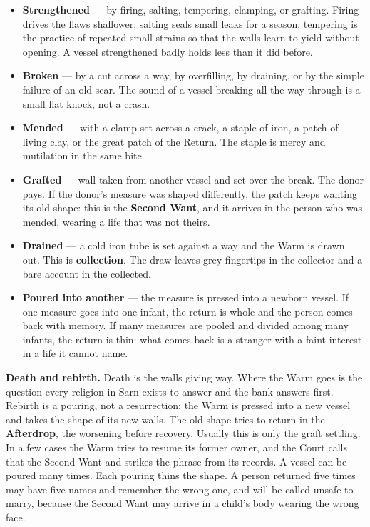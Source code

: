 \documentclass{design/chronicle}
\begin{document}
\begin{itemize}[leftmargin=1.4em,itemsep=1pt,topsep=3pt,parsep=0pt]

\item \textbf{Strengthened} — by firing, salting, tempering, clamping, or grafting. Firing drives the flaws shallower; salting seals small leaks for a season; tempering is the practice of repeated small strains so that the walls learn to yield without opening. A vessel strengthened badly holds less than it did before.

\item \textbf{Broken} — by a cut across a way, by overfilling, by draining, or by the simple failure of an old scar. The sound of a vessel breaking all the way through is a small flat knock, not a crash.

\item \textbf{Mended} — with a clamp set across a crack, a staple of iron, a patch of living clay, or the great patch of the Return. The staple is mercy and mutilation in the same bite.

\item \textbf{Grafted} — wall taken from another vessel and set over the break. The donor pays. If the donor’s measure was shaped differently, the patch keeps wanting its old shape: this is the \textbf{Second Want}, and it arrives in the person who was mended, wearing a life that was not theirs.

\item \textbf{Drained} — a cold iron tube is set against a way and the Warm is drawn out. This is \textbf{collection}. The draw leaves grey fingertips in the collector and a bare account in the collected.

\item \textbf{Poured into another} — the measure is pressed into a newborn vessel. If one measure goes into one infant, the return is whole and the person comes back with memory. If many measures are pooled and divided among many infants, the return is thin: what comes back is a stranger with a faint interest in a life it cannot name.

\end{itemize}

\textbf{Death and rebirth.} Death is the walls giving way. Where the Warm goes is the question every religion in Sarn exists to answer and the bank answers first. Rebirth is a pouring, not a resurrection: the Warm is pressed into a new vessel and takes the shape of its new walls. The old shape tries to return in the \textbf{Afterdrop}, the worsening before recovery. Usually this is only the graft settling. In a few cases the Warm tries to resume its former owner, and the Court calls that the Second Want and strikes the phrase from its records. A vessel can be poured many times. Each pouring thins the shape. A person returned five times may have five names and remember the wrong one, and will be called unsafe to marry, because the Second Want may arrive in a child’s body wearing the wrong face.
\end{document}
